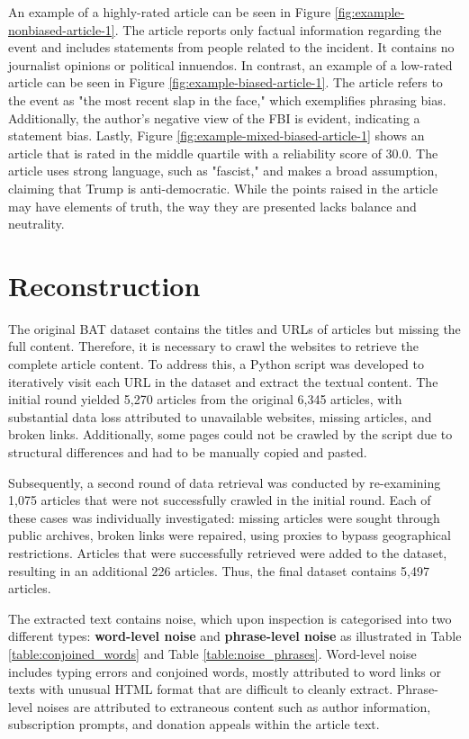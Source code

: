 An example of a highly-rated article can be seen in Figure \ref{fig:example-nonbiased-article-1}. The article reports only factual information regarding the event and includes statements from people related to the incident. It contains no journalist opinions or political innuendos. In contrast, an example of a low-rated article can be seen in Figure \ref{fig:example-biased-article-1}. The article refers to the event as "the most recent slap in the face," which exemplifies phrasing bias. Additionally, the author's negative view of the FBI is evident, indicating a statement bias. Lastly, Figure \ref{fig:example-mixed-biased-article-1} shows an article that is rated in the middle quartile with a reliability score of 30.0. The article uses strong language, such as "fascist," and makes a broad assumption, claiming that Trump is anti-democratic. While the points raised in the article may have elements of truth, the way they are presented lacks balance and neutrality.

\section{Reconstruction}

The original BAT dataset contains the titles and URLs of articles but missing the full content. Therefore, it is necessary to crawl the websites to retrieve the complete article content. To address this, a Python script was developed to iteratively visit each URL in the dataset and extract the textual content. The initial round yielded 5,270 articles from the original 6,345 articles, with substantial data loss attributed to unavailable websites, missing articles, and broken links. Additionally, some pages could not be crawled by the script due to structural differences and had to be manually copied and pasted.

Subsequently, a second round of data retrieval was conducted by re-examining 1,075 articles that were not successfully crawled in the initial round. Each of these cases was individually investigated: missing articles were sought through public archives, broken links were repaired, using proxies to bypass geographical restrictions. Articles that were successfully retrieved were added to the dataset, resulting in an additional 226 articles. Thus, the final dataset contains 5,497 articles.

The extracted text contains noise, which upon inspection is categorised into two different types: \textbf{word-level noise} and \textbf{phrase-level noise} as illustrated in Table \ref{table:conjoined_words} and Table \ref{table:noise_phrases}. Word-level noise includes typing errors and conjoined words, mostly attributed to word links or texts with unusual HTML format that are difficult to cleanly extract. Phrase-level noises are attributed to extraneous content such as author information, subscription prompts, and donation appeals within the article text.


